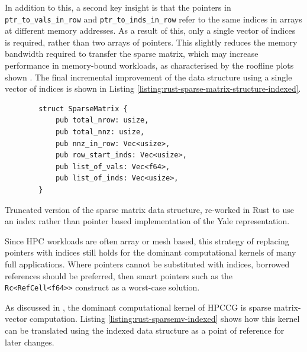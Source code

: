 In addition to this, a second key insight is that the pointers in \texttt{ptr_to_vals_in_row} and \texttt{ptr_to_inds_in_row} refer to the same indices in arrays at different memory addresses. As a result of this, only a single vector of indices is required, rather than two arrays of pointers. This slightly reduces the memory bandwidth required to transfer the sparse matrix, which may increase performance in memory-bound workloads, as characterised by the roofline plots shown . The final incremental improvement of the data structure using a single vector of indices is shown in Listing \ref{listing:rust-sparse-matrix-structure-indexed}.

\begin{code}
    \begin{verbatim}
        struct SparseMatrix {
            pub total_nrow: usize,
            pub total_nnz: usize,
            pub nnz_in_row: Vec<usize>,
            pub row_start_inds: Vec<usize>,
            pub list_of_vals: Vec<f64>,
            pub list_of_inds: Vec<usize>,
        }
    \end{verbatim}
    \caption{Truncated version of the sparse matrix data structure, re-worked in Rust to use an index rather than pointer based implementation of the Yale representation.}
    \label{listing:rust-sparse-matrix-structure-indexed}
\end{code}

Since \acrshort{HPC} workloads are often array or mesh based, this strategy of replacing pointers with indices still holds for the dominant computational kernels of many full applications. Where pointers cannot be substituted with indices, borrowed references should be preferred, then smart pointers such as the \texttt{Rc<RefCell<f64>>} construct as a worst-case solution.

As discussed in , the dominant computational kernel of HPCCG is sparse matrix-vector computation. Listing \ref{listing:rust-sparsemv-indexed} shows how this kernel can be translated using the indexed data structure as a point of reference for later changes.

